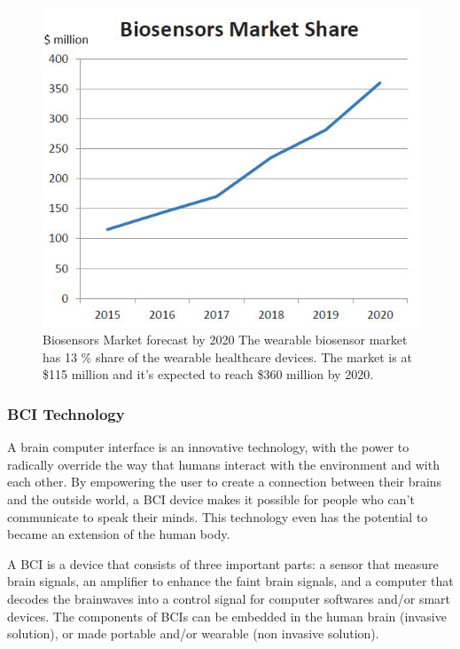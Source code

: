 \documentclass[letterpaper,10pt]{article}
\begin{document}
\begin{figure}[h]
\centering
\includegraphics[scale=0.5]{biosenzors_market_2015_2020.png}
\caption[Biosensors Market forecast by 2020]{Biosensors Market forecast by 2020 \cite{wearable} The wearable biosensor market has 13 \% share of the wearable healthcare devices. The market is at \$115 million and it’s expected to reach \$360 million by 2020.}
\end{figure}
 
\subsubsection{BCI Technology}

A brain computer interface is an innovative technology, with the power to radically override the way that humans interact with the environment and with each other. By empowering the user to create a connection between their brains and the outside world, a BCI device makes it possible for people who can’t communicate to speak their minds. This technology even has the potential to became an extension of the human body. \cite{neurosky_bci}

A BCI is a device that consists of three important parts: a sensor that measure brain signals, an amplifier to enhance the faint brain signals, and a computer that decodes the brainwaves into a control signal for computer softwares and/or smart devices. The components of BCIs can be embedded in the human brain (invasive solution), or made portable and/or wearable (non invasive solution). 
\end{document}
